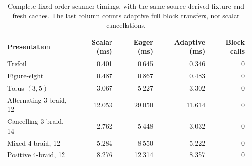 \begin{table}[htbp]
\centering\small
\begin{tabular}{@{}lrrrr@{}}\toprule
Presentation & Scalar (ms) & Eager (ms) & Adaptive (ms) & Block calls\\\midrule
Trefoil & 0.401 & 0.645 & 0.346 & 0\\
Figure-eight & 0.487 & 0.867 & 0.483 & 0\\
Torus $(3,5)$ & 3.067 & 5.227 & 3.302 & 0\\
Alternating 3-braid, 12 & 12.053 & 29.050 & 11.614 & 0\\
Cancelling 3-braid, 14 & 2.762 & 5.448 & 3.032 & 0\\
Mixed 4-braid, 12 & 5.284 & 8.550 & 5.222 & 0\\
Positive 4-braid, 12 & 8.276 & 12.314 & 8.357 & 0\\
\bottomrule\end{tabular}
\caption{Complete fixed-order scanner timings, with the same source-derived fixture and fresh caches. The last column counts adaptive full block transfers, not scalar cancellations.}
\label{tab:diagram}
\end{table}
